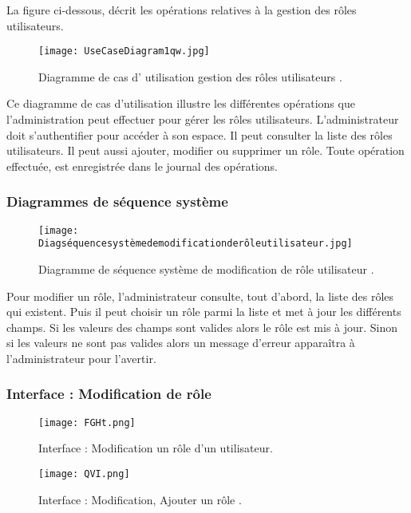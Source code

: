 La figure ci-dessous, décrit les opérations relatives à la gestion des rôles utilisateurs.
\begin{figure}[ht]
	\centering
	\texttt{[image: UseCaseDiagram1qw.jpg]}
	\caption{Diagramme de cas d' utilisation gestion des rôles utilisateurs .}
	\label{fig:Diagramme de cas d utilisation gestion des rôles utilisateurs }
\end{figure}
\FloatBarrier
Ce diagramme de cas d’utilisation illustre les différentes opérations que l’administration peut effectuer pour gérer les rôles utilisateurs. L’administrateur doit s’authentifier
pour accéder à son espace. Il peut consulter la liste des rôles utilisateurs. Il peut aussi
ajouter, modifier ou supprimer un rôle. Toute opération effectuée, est enregistrée dans le
journal des opérations.
\clearpage
\subsubsection{Diagrammes de séquence système }


\begin{figure}[ht]
	\centering
	\texttt{[image: Diagséquencesystèmedemodificationderôleutilisateur.jpg]}
	\caption{Diagramme de séquence système de modification de rôle utilisateur .}
	\label{fig:Diagramme de séquence système de modification de rôle utilisateur }
\end{figure}
\FloatBarrier

Pour modifier un rôle, l’administrateur consulte, tout d’abord, la liste des rôles qui
existent. Puis il peut choisir un rôle parmi la liste et met à jour les différents champs. Si
les valeurs des champs sont valides alors le rôle est mis à jour. Sinon si les valeurs ne sont
pas valides alors un message d’erreur apparaîtra à l’administrateur pour l’avertir.
\clearpage
\subsubsection{ Interface : Modification de rôle  }
\begin{figure}[ht]
	\centering
	\texttt{[image: FGHt.png]}
	\caption{Interface : Modification un rôle d'un utilisateur.}
	\label{fig:Modification de rôle1}
\end{figure}
\FloatBarrier
\begin{figure}[ht]
	\centering
	\texttt{[image: QVI.png]}
	\caption{Interface : Modification, Ajouter un rôle .}
	\label{fig:2 }
\end{figure}
\FloatBarrier


